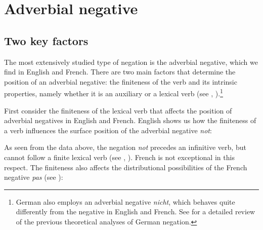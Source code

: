 \documentclass[output=paper
                ,modfonts
                ,nonflat
	        ,collection
	        ,collectionchapter
	        ,collectiontoclongg
 	        ,biblatex
                ,babelshorthands
                ,newtxmath
                ,draftmode
                ,colorlinks, citecolor=brown
]{./langsci/langscibook}
\begin{document}
{%
\section{Adverbial negative}

\subsection{Two key factors}


The most extensively studied type of negation is the adverbial negative, which
we find in English and French.
There are two main factors
that determine the position of an adverbial negative: the finiteness of
the verb and its intrinsic properties, namely whether it is an auxiliary
or a lexical  verb (see \citealt[Chapter~3]{Kim:00}, \citealt{KS:02}).\footnote{German also
employs an adverbial negative \textit{nicht}, which behaves quite
differently from the negative in English and French. See \citet[Section~11.7.1]{MuellerGT-Eng1}
for a detailed review of the previous theoretical analyses of German negation.}


First consider the finiteness of the lexical verb that affects
the position of adverbial
negatives in English and French.
English shows us how the finiteness of a verb influences the
surface position of the adverbial negative \textit{not}:

\begin{exe}
\ex\label{negation-eng-fin-neg} \begin{xlist}
\zl


\begin{exe}
\ex\label{negation-fr-fin-neg} \begin{xlist}
\zl
%
\noindent As seen from the data above, the negation \textit{not} precedes an infinitive verb, but cannot follow
a finite lexical  verb (see \citealt[Chapter~15]{Baker:89}, \citealt{Baker:91,Ernst:92}).
French is not exceptional in this respect. The finiteness also affects the distributional possibilities of the French negative \emph{pas} (see \citealt{AG:97, KS:02, Zeijlstra:15}):

\eal
{}
\zl


\end{xlist}
\end{exe}
\end{xlist}
\end{exe}}
\end{document}
